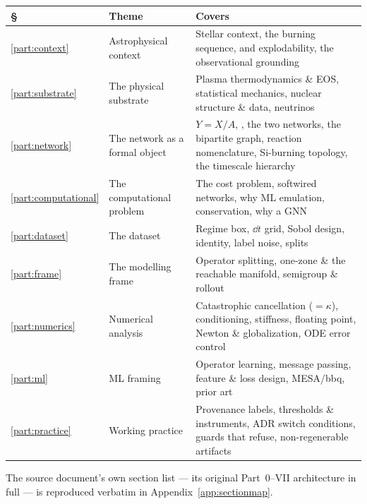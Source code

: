 \begin{tabularx}{\textwidth}{@{}L{1.1cm} L{4.3cm} Y@{}}
\toprule
\textbf{\S} & \textbf{Theme} & \textbf{Covers} \\
\midrule
\ref{part:context} & Astrophysical context &
  Stellar context, the burning sequence, \Ye{} and explodability, the
  observational grounding \\
\ref{part:substrate} & The physical substrate &
  Plasma thermodynamics \& EOS, statistical mechanics, nuclear structure \&
  data, neutrinos \\
\ref{part:network} & The network as a formal object &
  $Y = X/A$, \Ye{}, the two networks, the bipartite graph, reaction
  nomenclature, Si-burning topology, the timescale hierarchy \\
\ref{part:computational} & The computational problem &
  The cost problem, softwired networks, why ML emulation, conservation, why a
  GNN \\
\ref{part:dataset} & The dataset &
  Regime box, $\dd t$ grid, Sobol design, identity, label noise, splits \\
\ref{part:frame} & The modelling frame &
  Operator splitting, one-zone \& the reachable manifold, semigroup \& rollout \\
\ref{part:numerics} & Numerical analysis &
  Catastrophic cancellation ($=\kappa$), conditioning, stiffness, floating
  point, Newton \& globalization, ODE error control \\
\ref{part:ml} & ML framing &
  Operator learning, message passing, feature \& loss design, MESA/bbq, prior
  art \\
\ref{part:practice} & Working practice &
  Provenance labels, thresholds \& instruments, ADR switch conditions, guards
  that refuse, non-regenerable artifacts \\
\bottomrule
\end{tabularx}

\vspace{1em}
{\small The source document's own section list --- its original Part~0--VII
architecture in full --- is reproduced verbatim in
Appendix~\ref{app:sectionmap}.}

\clearpage
\tableofcontents
\clearpage
